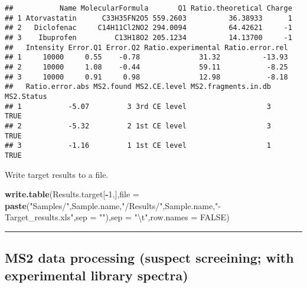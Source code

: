 \documentclass[]{article}
\newenvironment{Shaded}{\begin{snugshade}}{\end{snugshade}}
\newcommand{\KeywordTok}[1]{\textcolor[rgb]{0.13,0.29,0.53}{\textbf{#1}}}
\newcommand{\DataTypeTok}[1]{\textcolor[rgb]{0.13,0.29,0.53}{#1}}
\newcommand{\DecValTok}[1]{\textcolor[rgb]{0.00,0.00,0.81}{#1}}
\newcommand{\CharTok}[1]{\textcolor[rgb]{0.31,0.60,0.02}{#1}}
\newcommand{\StringTok}[1]{\textcolor[rgb]{0.31,0.60,0.02}{#1}}
\newcommand{\OtherTok}[1]{\textcolor[rgb]{0.56,0.35,0.01}{#1}}
\newcommand{\OperatorTok}[1]{\textcolor[rgb]{0.81,0.36,0.00}{\textbf{#1}}}
\newcommand{\NormalTok}[1]{#1}
\begin{document}
\begin{verbatim}
##           Name MolecularFormula       Q1 Ratio.theoretical Charge
## 1 Atorvastatin      C33H35FN2O5 559.2603          36.38933      1
## 2   Diclofenac     C14H11Cl2NO2 294.0094          64.42621     -1
## 3    Ibuprofen         C13H18O2 205.1234          14.13700     -1
##   Intensity Error.Q1 Error.Q2 Ratio.experimental Ratio.error.rel
## 1     10000     0.55    -0.78              31.32          -13.93
## 2     10000     1.08    -0.44              59.11           -8.25
## 3     10000     0.91     0.98              12.98           -8.18
##   Ratio.error.abs MS2.found MS2.CE.level MS2.fragments.in.db MS2.Status
## 1           -5.07         3 3rd CE level                   3       TRUE
## 2           -5.32         2 1st CE level                   3       TRUE
## 3           -1.16         1 1st CE level                   1       TRUE
\end{verbatim}

Write target results to a file.

\begin{Shaded}
\begin{Highlighting}[]
\KeywordTok{write.table}\NormalTok{(Results.target[}\OperatorTok{-}\DecValTok{1}\NormalTok{,],}\DataTypeTok{file =} \KeywordTok{paste}\NormalTok{(}\StringTok{"Samples/"}\NormalTok{,Sample.name,}\StringTok{"/Results/"}\NormalTok{,Sample.name,}\StringTok{"-Target_results.xls"}\NormalTok{,}\DataTypeTok{sep =} \StringTok{""}\NormalTok{),}\DataTypeTok{sep =} \StringTok{"}\CharTok{\textbackslash{}t}\StringTok{"}\NormalTok{,}\DataTypeTok{row.names =} \OtherTok{FALSE}\NormalTok{)}
\end{Highlighting}
\end{Shaded}

\begin{center}\rule{0.5\linewidth}{\linethickness}\end{center}

\subsection{MS2 data processing (suspect screeining; with experimental
library
spectra)}\label{ms2-data-processing-suspect-screeining-with-experimental-library-spectra}
\end{document}
